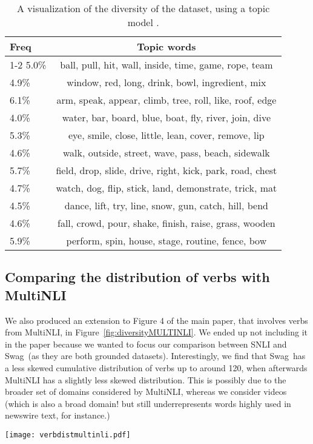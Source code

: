 \documentclass[11pt,a4paper]{article}
\newcommand\customfont[1]{{\usefont{T1}{perm}{m}{n}#1}}
\newcommand{\datasetname}{{\small\customfont{Swag}}}
\begin{document}
\begin{table}[t]
    \small
    \centering
    \begin{tabular}{@{}l @{\hspace{0.2cm}} c @{}}
        \toprule
        Freq & Topic words\\
        \midrule
        \cmidrule{1-2}
5.0\% & ball, pull, hit, wall, inside, time, game, rope, team \\ 4.9\% & window, red, long, drink, bowl, ingredient, mix \\
6.1\% & arm, speak, appear, climb, tree, roll, like, roof, edge \\ 4.0\% & water, bar, board, blue, boat, fly, river, join, dive \\ 
5.3\% & eye, smile, close, little,  lean, cover, remove, lip \\ 
4.6\% & walk, outside, street, wave, pass, beach, sidewalk \\ 
5.7\% & field, drop, slide, drive, right, kick, park, road, chest \\ 
4.7\% & watch, dog, flip, stick, land, demonstrate, trick, mat \\ 
4.5\% & dance, lift, try, line, snow, gun, catch, hill, bend \\ 4.6\% & fall, crowd, pour, shake, finish, raise, grass, wooden \\ 
5.9\% & perform, spin, house, stage, routine, fence, bow \\ 
         \bottomrule
    \end{tabular}
    \caption{A visualization of the diversity of the dataset, using a topic model \cite{blei2003latent}. }
    \label{tab:lda}
\end{table}

\subsection{Comparing the distribution of verbs with MultiNLI}
We also produced an extension to Figure 4 of the main paper, that involves verbs from MultiNLI, in Figure~\ref{fig:diversityMULTINLI}. We ended up not including it in the paper because we wanted to focus our comparison between SNLI and \datasetname~(as they are both grounded datasets). Interestingly, we find that \datasetname~has a less skewed cumulative distribution of verbs up to around 120, when afterwards MultiNLI has a slightly less skewed distribution. This is possibly due to the broader set of domains considered by MultiNLI, whereas we consider videos (which is also a broad domain! but still underrepresents words highly used in newswire text, for instance.)
\begin{figure*}[t]
\centering\texttt{[image: verbdistmultinli.pdf]}
    \caption{Bottom: CDF for verbs in SNLI, \datasetname, and MultiNLI.}
    \label{fig:diversityMULTINLI}
\end{figure*}
\end{document}
